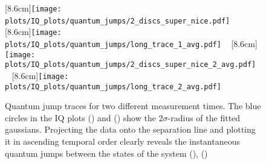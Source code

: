 \FloatBarrier

\begin{figure}
\centering
{}
[8.6cm]{\texttt{[image: plots/IQ\_plots/quantum\_jumps/2\_discs\_super\_nice.pdf]}}
~
[8.6cm]{\texttt{[image: plots/IQ\_plots/quantum\_jumps/long\_trace\_1\_avg.pdf]}}
~
[8.6cm]{\texttt{[image: plots/IQ\_plots/quantum\_jumps/2\_discs\_super\_nice\_2\_avg.pdf]}}
~
[8.6cm]{\texttt{[image: plots/IQ\_plots/quantum\_jumps/long\_trace\_2\_avg.pdf]}}
\caption{
Quantum jump traces for two different measurement times. The blue circles in the IQ plots () and () show the $2\sigma$-radius of the fitted gaussians. Projecting the data onto the separation line and plotting it in ascending temporal order clearly reveals the instantaneous quantum jumps between the states of the system (), ()
}
\label{fig:quamtum_jumps:main}
\end{figure}


\FloatBarrier